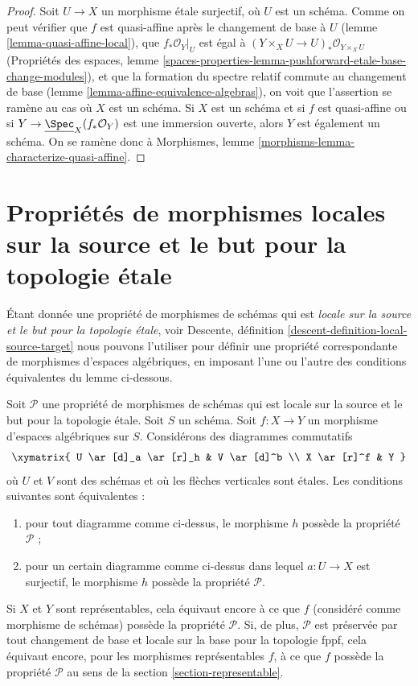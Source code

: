 \begin{proof}
Soit $U \to X$ un morphisme étale surjectif, où $U$ est un schéma.
Comme on peut vérifier que $f$ est quasi-affine après le changement de base à
$U$ (lemme \ref{lemma-quasi-affine-local}), que $f_*\mathcal{O}_Y|_U$
est égal à $(Y \times_X U \to U)_*\mathcal{O}_{Y \times_X U}$
(Propriétés des espaces, lemme
\ref{spaces-properties-lemma-pushforward-etale-base-change-modules}), et
que la formation du spectre relatif commute au changement de base
(lemme \ref{lemma-affine-equivalence-algebras}),
on voit que l'assertion se ramène au cas où $X$ est un schéma.
Si $X$ est un schéma et si $f$ est quasi-affine ou si
$Y \to \underline{\Spec}_X(f_*\mathcal{O}_Y)$ est une immersion ouverte,
alors $Y$ est également un schéma. On se ramène donc à
Morphismes, lemme \ref{morphisms-lemma-characterize-quasi-affine}.
\end{proof}







\section{Propriétés de morphismes locales sur la source et le but pour la topologie étale}
\label{section-local-source-target}

\noindent
Étant donnée une propriété de morphismes de schémas qui est {\it locale sur la
source et le but pour la topologie étale}, voir
Descente, définition \ref{descent-definition-local-source-target}
nous pouvons l'utiliser pour définir une propriété correspondante
de morphismes d'espaces algébriques, en imposant l'une ou l'autre des
conditions équivalentes du lemme ci-dessous.

\begin{lemma}
\label{lemma-local-source-target}
Soit $\mathcal{P}$ une propriété de morphismes de schémas
qui est locale sur la source et le but pour la topologie étale.
Soit $S$ un schéma.
Soit $f : X \to Y$ un morphisme d'espaces algébriques sur $S$.
Considérons des diagrammes commutatifs
$$
\xymatrix{
U \ar[d]_a \ar[r]_h & V \ar[d]^b \\
X \ar[r]^f & Y
}
$$
où $U$ et $V$ sont des schémas et où les flèches verticales sont étales.
Les conditions suivantes sont équivalentes :
\begin{enumerate}
\item pour tout diagramme comme ci-dessus, le morphisme $h$ possède la propriété
$\mathcal{P}$ ;
\item pour un certain diagramme comme ci-dessus dans lequel $a : U \to X$ est
surjectif, le morphisme $h$ possède la propriété $\mathcal{P}$.
\end{enumerate}
Si $X$ et $Y$ sont représentables, cela équivaut encore à ce que
$f$ (considéré comme morphisme de schémas) possède la propriété $\mathcal{P}$.
Si, de plus, $\mathcal{P}$ est préservée par tout changement de base et
locale sur la base pour la topologie fppf, cela équivaut encore, pour les
morphismes représentables $f$, à ce que $f$ possède la propriété $\mathcal{P}$
au sens de la section \ref{section-representable}.
\end{lemma}

